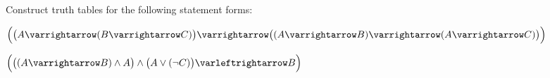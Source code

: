 \documentclass[10pt]{article}
\let\to=\varrightarrow
\let\oto=\varleftrightarrow
\begin{document}


\bigskip

\begin{exercise*}

    Construct truth tables for the following statement forms:
    \benum
        \item $\Bigl(\bigl(A\to(B\to C)\bigr)\to\bigl((A\to B)\to(A\to C)\bigr)\Bigr)$
        \item $\Bigl(\big((A\to B)\land A\bigr)\land\bigl(A\lor(\neg C)\bigr)\oto B\Bigr)$
    \eenum

\end{exercise*}
\end{document}
